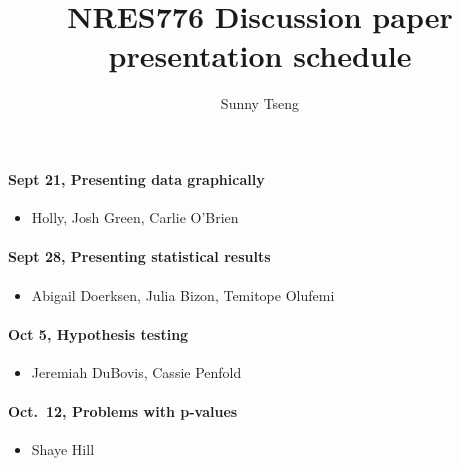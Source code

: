 \documentclass[
  letterpaper,
  DIV=11,
  numbers=noendperiod]{scrartcl}
\title{NRES776 Discussion paper presentation schedule}
\author{Sunny Tseng}
\date{}
\let\oldparagraph\paragraph
\renewcommand{\paragraph}[1]{\oldparagraph{#1}\mbox{}}
\providecommand{\tightlist}{%
  \setlength{\itemsep}{0pt}\setlength{\parskip}{0pt}}\usepackage{longtable,booktabs,array}
\begin{document}
\maketitle
\ifdefined\Shaded\renewenvironment{Shaded}{\begin{tcolorbox}[interior hidden, boxrule=0pt, borderline west={3pt}{0pt}{shadecolor}, sharp corners, enhanced, frame hidden, breakable]}{\end{tcolorbox}}\fi

\hypertarget{sept-21-presenting-data-graphically}{%
\paragraph{Sept 21, Presenting data
graphically}\label{sept-21-presenting-data-graphically}}

\begin{itemize}
\tightlist
\item
  Holly, Josh Green, Carlie O'Brien
\end{itemize}

\hypertarget{sept-28-presenting-statistical-results}{%
\paragraph{Sept 28, Presenting statistical
results}\label{sept-28-presenting-statistical-results}}

\begin{itemize}
\tightlist
\item
  Abigail Doerksen, Julia Bizon, Temitope Olufemi
\end{itemize}

\hypertarget{oct-5-hypothesis-testing}{%
\paragraph{Oct 5, Hypothesis testing}\label{oct-5-hypothesis-testing}}

\begin{itemize}
\tightlist
\item
  Jeremiah DuBovis, Cassie Penfold
\end{itemize}

\hypertarget{oct.-12-problems-with-p-values}{%
\paragraph{Oct.~12, Problems with
p-values}\label{oct.-12-problems-with-p-values}}

\begin{itemize}
\tightlist
\item
  Shaye Hill
\end{itemize}
\end{document}
